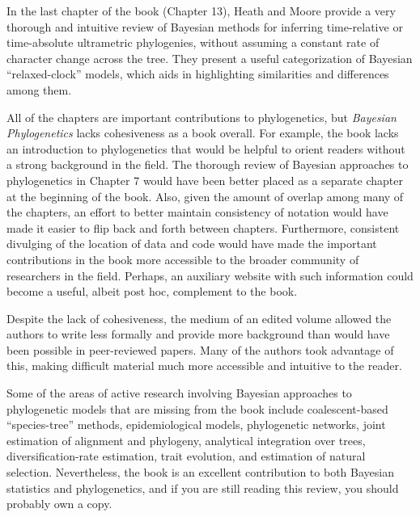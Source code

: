 \documentclass[letterpaper,12pt]{article}
\newcommand{\booktitle}{\textit{Bayesian Phylogenetics}\xspace}
\begin{document}
In the last chapter of the book (Chapter 13),
Heath and Moore provide a very thorough and intuitive review of Bayesian
methods for inferring time-relative or time-absolute ultrametric phylogenies,
without assuming a constant rate of character change across the tree.
They present a useful categorization of Bayesian ``relaxed-clock'' models,
which aids in highlighting similarities and differences among them.

All of the chapters are important contributions to phylogenetics, but
\booktitle lacks cohesiveness as a book overall.
For example, the book lacks an introduction to phylogenetics that would be
helpful to orient readers without a strong background in the field.
The thorough review of Bayesian approaches to phylogenetics in Chapter 7 would
have been better placed as a separate chapter at the beginning of the book.
Also, given the amount of overlap among many of the chapters, an effort to
better maintain consistency of notation would have made it easier to flip back
and forth between chapters.
Furthermore, consistent divulging of the location of data and code would have
made the important contributions in the book more accessible to the broader
community of researchers in the field.
Perhaps, an auxiliary website with such information could become a useful,
albeit post hoc, complement to the book.

Despite the lack of cohesiveness, the medium of an edited volume allowed the
authors to write less formally and provide more background than would have been
possible in peer-reviewed papers.
Many of the authors took advantage of this, making difficult material much more
accessible and intuitive to the reader.

Some of the areas of active research involving Bayesian approaches to
phylogenetic models that are missing from the book include
coalescent-based ``species-tree'' methods,
epidemiological models,
phylogenetic networks,
joint estimation of alignment and phylogeny,
analytical integration over trees,
diversification-rate estimation,
trait evolution,
and
estimation of natural selection.
Nevertheless, the book is an excellent contribution to both Bayesian statistics
and phylogenetics, and if you are still reading this review, you should
probably own a copy.



\end{document}
